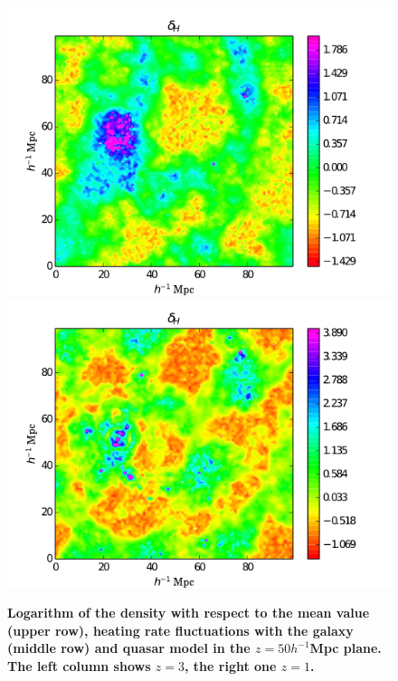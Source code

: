 \documentclass[twocolumns]{emulateapj}
\newcommand\ALc[1]{{\color{red} \bf #1}} %
\begin{document}
\begin{figure}
\includegraphics[width = .45\textwidth ]{data_delta_z3_qso4.png}
\includegraphics[width = .45\textwidth ]{data_delta_z1_qso4.png}

   \caption{ \ALc{Logarithm of the density with respect to the mean value (upper row), heating rate fluctuations with the galaxy (middle row) and quasar model  in the $z=50 h^{-1} $Mpc plane. The left column shows $z=3$, the right one $z=1$. }}
  \label{fig:slice}
\end{figure}
\end{document}
